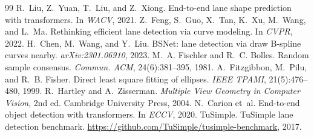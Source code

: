 \documentclass[11pt]{article}
\begin{document}
\begin{thebibliography}{99}
 R.~Liu, Z.~Yuan, T.~Liu, and Z.~Xiong. End-to-end lane shape prediction with transformers. In \emph{WACV}, 2021.
 Z.~Feng, S.~Guo, X.~Tan, K.~Xu, M.~Wang, and L.~Ma. Rethinking efficient lane detection via curve modeling. In \emph{CVPR}, 2022.
 H.~Chen, M.~Wang, and Y.~Liu. BSNet: lane detection via draw B-spline curves nearby. \emph{arXiv:2301.06910}, 2023.
 M.~A. Fischler and R.~C. Bolles. Random sample consensus. \emph{Commun. ACM}, 24(6):381--395, 1981.
 A.~Fitzgibbon, M.~Pilu, and R.~B. Fisher. Direct least square fitting of ellipses. \emph{IEEE TPAMI}, 21(5):476--480, 1999.
 R.~Hartley and A.~Zisserman. \emph{Multiple View Geometry in Computer Vision}, 2nd ed. Cambridge University Press, 2004.
 N.~Carion et~al. End-to-end object detection with transformers. In \emph{ECCV}, 2020.
 TuSimple. TuSimple lane detection benchmark. \url{https://github.com/TuSimple/tusimple-benchmark}, 2017.
\end{thebibliography}
\end{document}

